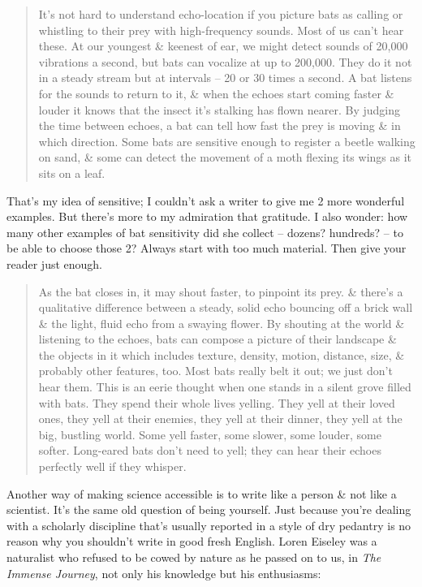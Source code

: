 \documentclass{article}
\begin{document}
\begin{quotation}
	It's not hard to understand echo-location if you picture bats as calling or whistling to their prey with high-frequency sounds. Most of us can't hear these. At our youngest \& keenest of ear, we might detect sounds of 20,000 vibrations a second, but bats can vocalize at up to 200,000. They do it not in a steady stream but at intervals -- 20 or 30 times a second. A bat listens for the sounds to return to it, \& when the echoes start coming faster \& louder it knows that the insect it's stalking has flown nearer. By judging the time between echoes, a bat can tell how fast the prey is moving \& in which direction. Some bats are sensitive enough to register a beetle walking on sand, \& some can detect the movement of a moth flexing its wings as it sits on a leaf.
\end{quotation}
That's my idea of sensitive; I couldn't ask a writer to give me 2 more wonderful examples. But there's more to my admiration that gratitude. I also wonder: how many other examples of bat sensitivity did she collect -- dozens? hundreds? -- to be able to choose those 2? Always start with too much material. Then give your reader just enough.
\begin{quotation}
	As the bat closes in, it may shout faster, to pinpoint its prey. \& there's a qualitative difference between a steady, solid echo bouncing off a brick wall \& the light, fluid echo from a swaying flower. By shouting at the world \& listening to the echoes, bats can compose a picture of their landscape \& the objects in it which includes texture, density, motion, distance, size, \& probably other features, too. Most bats really belt it out; we just don't hear them. This is an eerie thought when one stands in a silent grove filled with bats. They spend their whole lives yelling. They yell at their loved ones, they yell at their enemies, they yell at their dinner, they yell at the big, bustling world. Some yell faster, some slower, some louder, some softer. Long-eared bats don't need to yell; they can hear their echoes perfectly well if they whisper.
\end{quotation}
Another way of making science accessible is to write like a person \& not like a scientist. It's the same old question of being yourself. Just because you're dealing with a scholarly discipline that's usually reported in a style of dry pedantry is no reason why you shouldn't write in good fresh English. Loren Eiseley was a naturalist who refused to be cowed by nature as he passed on to us, in \textit{The Immense Journey}, not only his knowledge but his enthusiasms:
\end{document}
